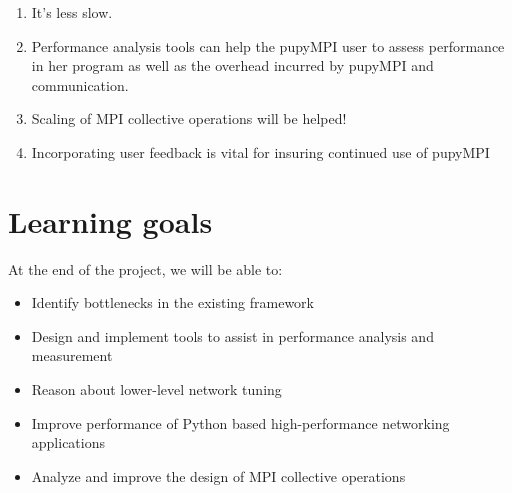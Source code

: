 \documentclass{article}
\begin{document}
\begin{enumerate}
	\item It's less slow.
	\item Performance analysis tools can help the pupyMPI user to assess
	performance in her program as well as the overhead incurred by pupyMPI and
	communication.
	\item Scaling of MPI collective operations will be helped!
	\item Incorporating user feedback is vital for insuring continued use of pupyMPI
\end{enumerate}

\section*{Learning goals}
At the end of the project, we will be able to: 

\begin{itemize}
	\item{ Identify bottlenecks in the existing framework }
	\item{ Design and implement tools to assist in performance analysis and measurement }
	\item{ Reason about lower-level network tuning }
	\item{ Improve performance of Python based high-performance networking applications }
	\item{ Analyze and improve the design of MPI collective operations }
\end{itemize}
\end{document}
